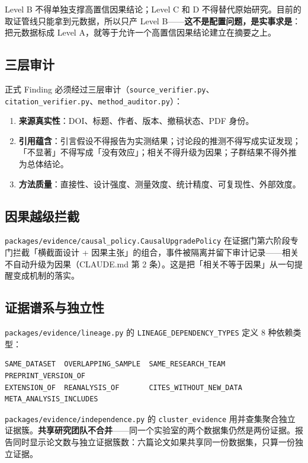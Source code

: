 Level B 不得单独支撑高置信因果结论；Level C 和 D 不得替代原始研究。目前的取证管线只能拿到元数据，所以只产 Level B——\textbf{这不是配置问题，是实事求是}：把元数据标成 Level A，就等于允许一个高置信因果结论建立在摘要之上。

\subsection{三层审计}

正式 Finding 必须经过三层审计（\texttt{source\_verifier.py}、\texttt{citation\_verifier.py}、\texttt{method\_auditor.py}）：

\begin{enumerate}
\item \textbf{来源真实性}：DOI、标题、作者、版本、撤稿状态、PDF 身份。
\item \textbf{引用蕴含}：引言假设不得报告为实测结果；讨论段的推测不得写成实证发现；「不显著」不得写成「没有效应」；相关不得升级为因果；子群结果不得外推为总体结论。
\item \textbf{方法质量}：直接性、设计强度、测量效度、统计精度、可复现性、外部效度。
\end{enumerate}

\subsection{因果越级拦截}

\texttt{packages/evidence/causal\_policy.CausalUpgradePolicy} 在证据门第六阶段专门拦截「横截面设计 + 因果主张」的组合，事件被隔离并留下审计记录——相关不自动升级为因果（CLAUDE.md 第 2 条）。这是把「相关不等于因果」从一句提醒变成机制的落实。

\subsection{证据谱系与独立性}

\texttt{packages/evidence/lineage.py} 的 \texttt{LINEAGE\_DEPENDENCY\_TYPES} 定义 8 种依赖类型：

\begin{verbatim}
SAME_DATASET  OVERLAPPING_SAMPLE  SAME_RESEARCH_TEAM  PREPRINT_VERSION_OF
EXTENSION_OF  REANALYSIS_OF       CITES_WITHOUT_NEW_DATA  META_ANALYSIS_INCLUDES
\end{verbatim}

\texttt{packages/evidence/independence.py} 的 \texttt{cluster\_evidence} 用并查集聚合独立证据簇。\textbf{共享研究团队不合并}——同一个实验室的两个数据集仍然是两份证据。报告同时显示论文数与独立证据簇数：六篇论文如果共享同一份数据集，只算一份独立证据。


